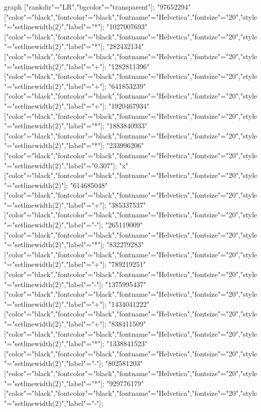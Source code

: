  {
    graph ["rankdir"="LR","bgcolor"="transparent"];
    "97652294" ["color"="black","fontcolor"="black","fontname"="Helvetica","fontsize"="20","style"="setlinewidth(2)","label"="*"];
    "1027007693" ["color"="black","fontcolor"="black","fontname"="Helvetica","fontsize"="20","style"="setlinewidth(2)","label"="*"];
    "282432134" ["color"="black","fontcolor"="black","fontname"="Helvetica","fontsize"="20","style"="setlinewidth(2)","label"="+"];
    "1282811396" ["color"="black","fontcolor"="black","fontname"="Helvetica","fontsize"="20","style"="setlinewidth(2)","label"="+"];
    "641853239" ["color"="black","fontcolor"="black","fontname"="Helvetica","fontsize"="20","style"="setlinewidth(2)","label"="+"];
    "1920467934" ["color"="black","fontcolor"="black","fontname"="Helvetica","fontsize"="20","style"="setlinewidth(2)","label"="*"];
    "1883840933" ["color"="black","fontcolor"="black","fontname"="Helvetica","fontsize"="20","style"="setlinewidth(2)","label"="*"];
    "233996206" ["color"="black","fontcolor"="black","fontname"="Helvetica","fontsize"="20","style"="setlinewidth(2)","label"="0.307"];
    "x" ["color"="black","fontcolor"="black","fontname"="Helvetica","fontsize"="20","style"="setlinewidth(2)"];
    "614685048" ["color"="black","fontcolor"="black","fontname"="Helvetica","fontsize"="20","style"="setlinewidth(2)","label"="+"];
    "385337537" ["color"="black","fontcolor"="black","fontname"="Helvetica","fontsize"="20","style"="setlinewidth(2)","label"="-"];
    "265119009" ["color"="black","fontcolor"="black","fontname"="Helvetica","fontsize"="20","style"="setlinewidth(2)","label"="*"];
    "832279283" ["color"="black","fontcolor"="black","fontname"="Helvetica","fontsize"="20","style"="setlinewidth(2)","label"="+"];
    "789219251" ["color"="black","fontcolor"="black","fontname"="Helvetica","fontsize"="20","style"="setlinewidth(2)","label"="-"];
    "1375995437" ["color"="black","fontcolor"="black","fontname"="Helvetica","fontsize"="20","style"="setlinewidth(2)","label"="+"];
    "1434041222" ["color"="black","fontcolor"="black","fontname"="Helvetica","fontsize"="20","style"="setlinewidth(2)","label"="+"];
    "838411509" ["color"="black","fontcolor"="black","fontname"="Helvetica","fontsize"="20","style"="setlinewidth(2)","label"="*"];
    "1338841523" ["color"="black","fontcolor"="black","fontname"="Helvetica","fontsize"="20","style"="setlinewidth(2)","label"="-"];
    "802581203" ["color"="black","fontcolor"="black","fontname"="Helvetica","fontsize"="20","style"="setlinewidth(2)","label"="*"];
    "929776179" ["color"="black","fontcolor"="black","fontname"="Helvetica","fontsize"="20","style"="setlinewidth(2)","label"="-"];
}
